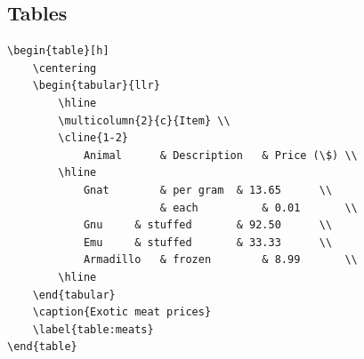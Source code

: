 \documentclass[12pt]{article}
\begin{document}
\subsection{Tables}\label{sec:tables}
\begin{verbatim}
\begin{table}[h]
	\centering
	\begin{tabular}{llr}
		\hline
		\multicolumn{2}{c}{Item} \\
		\cline{1-2}
			Animal   	& Description 	& Price (\$) \\
		\hline
			Gnat		& per gram	& 13.65      \\
				        & each       	& 0.01       \\
			Gnu		& stuffed     	& 92.50      \\
			Emu		& stuffed		& 33.33      \\
			Armadillo	& frozen		& 8.99       \\
		\hline
	\end{tabular}
	\caption{Exotic meat prices}
	\label{table:meats}
\end{table}
\end{verbatim}
\end{document}
